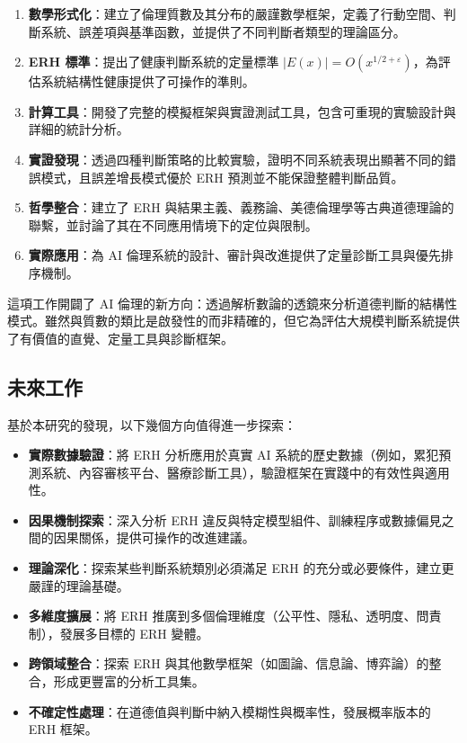 \documentclass[12pt,a4paper]{article}
\theoremstyle{definition}
\theoremstyle{remark}
\begin{document}
\begin{enumerate}
    \item \textbf{數學形式化}：建立了倫理質數及其分布的嚴謹數學框架，定義了行動空間、判斷系統、誤差項與基準函數，並提供了不同判斷者類型的理論區分。
    \item \textbf{ERH 標準}：提出了健康判斷系統的定量標準 $|E(x)| = O(x^{1/2+\varepsilon})$，為評估系統結構性健康提供了可操作的準則。
    \item \textbf{計算工具}：開發了完整的模擬框架與實證測試工具，包含可重現的實驗設計與詳細的統計分析。
    \item \textbf{實證發現}：透過四種判斷策略的比較實驗，證明不同系統表現出顯著不同的錯誤模式，且誤差增長模式優於 ERH 預測並不能保證整體判斷品質。
    \item \textbf{哲學整合}：建立了 ERH 與結果主義、義務論、美德倫理學等古典道德理論的聯繫，並討論了其在不同應用情境下的定位與限制。
    \item \textbf{實際應用}：為 AI 倫理系統的設計、審計與改進提供了定量診斷工具與優先排序機制。
\end{enumerate}

這項工作開闢了 AI 倫理的新方向：透過解析數論的透鏡來分析道德判斷的結構性模式。雖然與質數的類比是啟發性的而非精確的，但它為評估大規模判斷系統提供了有價值的直覺、定量工具與診斷框架。

\subsection{未來工作}

基於本研究的發現，以下幾個方向值得進一步探索：

\begin{itemize}
    \item \textbf{實際數據驗證}：將 ERH 分析應用於真實 AI 系統的歷史數據（例如，累犯預測系統、內容審核平台、醫療診斷工具），驗證框架在實踐中的有效性與適用性。
    \item \textbf{因果機制探索}：深入分析 ERH 違反與特定模型組件、訓練程序或數據偏見之間的因果關係，提供可操作的改進建議。
    \item \textbf{理論深化}：探索某些判斷系統類別必須滿足 ERH 的充分或必要條件，建立更嚴謹的理論基礎。
    \item \textbf{多維度擴展}：將 ERH 推廣到多個倫理維度（公平性、隱私、透明度、問責制），發展多目標的 ERH 變體。
    \item \textbf{跨領域整合}：探索 ERH 與其他數學框架（如圖論、信息論、博弈論）的整合，形成更豐富的分析工具集。
    \item \textbf{不確定性處理}：在道德值與判斷中納入模糊性與概率性，發展概率版本的 ERH 框架。
\end{itemize}
\end{document}

